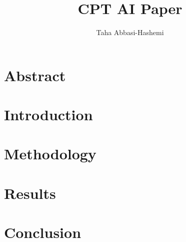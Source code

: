 \documentclass{article}
\title{CPT AI Paper}
\author{Taha Abbasi-Hashemi}
\begin{document}
    
    
    
    \section{Abstract}
    
    
    \section{Introduction}
    
    
    \section{Methodology}
    
    
    \section{Results}
    
    
    \section{Conclusion}
    
\end{document}

